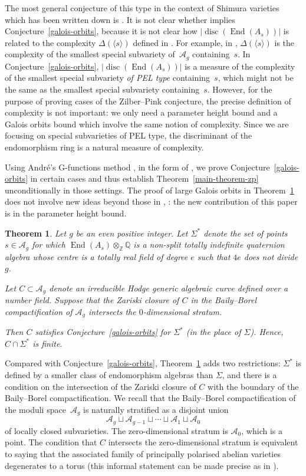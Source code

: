 \documentclass[JEP,XML,SOM,Unicode,NoFloatCountersInSection]{cedram}
\newcommand{\bQ}{\mathbb{Q}}
\newcommand{\bZ}{\mathbb{Z}}
\newcommand{\cA}{\mathcal{A}}
\newcommand{\Ag}{\mathcal{A}_g}
\DeclareMathOperator{\disc}{disc}
\DeclareMathOperator{\End}{End}
\newcommand{\abs}[1]{\lvert #1 \rvert}
\newtheorem{theorem}[lemma]{Theorem}
\begin{document}
The most general conjecture of this type in the context of Shimura varieties which has been written down is \cite[Conj.\,11.1]{DR18}.
It is not clear whether \cite[Conj.\,11.1]{DR18} implies Conjecture~\ref{galois-orbits}, because it is not clear how $\abs{\disc(\End(A_s))}$ is related to the complexity $\Delta(\langle s \rangle)$ defined in \cite{DR18}.
For example, in \cite[Conj.\,11.1]{DR18}, $\Delta(\langle s \rangle)$ is the complexity of the smallest special subvariety of~$\Ag$ containing~$s$.
In Conjecture~\ref{galois-orbits}, $\abs{\disc(\End(A_s))}$ is a measure of the complexity of the smallest special subvariety \textit{of PEL type} containing~$s$, which might not be the same as the smallest special subvariety containing~$s$.
However, for the purpose of proving cases of the Zilber--Pink conjecture, the precise definition of complexity is not important: we only need a parameter height bound and a Galois orbits bound which involve the same notion of complexity. Since we are focusing on special subvarieties of PEL type, the discriminant of the endomorphism ring is a natural measure of complexity.

Using André's G-functions method \cite{And89}, in the form of \cite[Th.\,8.2]{ExCM}, we prove Conjecture~\ref{galois-orbits} in certain cases and thus establish Theorem~\ref{main-theorem-zp} unconditionally in those settings.
The proof of large Galois orbits in Theorem~\ref{unconditional} does not involve new ideas beyond those in \cite{ExCM}, \cite{QRTUI}: the new contribution of this paper is in the parameter height bound.

\begin{theorem}\label{unconditional}
Let $g$ be an even positive integer.
Let $\Sigma^*$ denote the set of points $s \in \Ag$ for which $\End(A_s) \otimes_\bZ \bQ$ is a non-split totally indefinite quaternion algebra whose centre is a totally real field of degree $e$ such that $4e$ does not divide $g$.

Let $C\subset\cA_g$ denote an irreducible Hodge generic algebraic curve defined over a number field. Suppose that the Zariski closure of $C$ in the Baily--Borel compactification of $\Ag$ intersects the $0$-dimensional stratum.

Then $C$ satisfies Conjecture~\ref{galois-orbits} for $\Sigma^*$ (in the place of $\Sigma$). Hence, $C \cap \Sigma^*$ is finite.
\end{theorem}

Compared with Conjecture~\ref{galois-orbits}, Theorem~\ref{unconditional} adds two restrictions: $\Sigma^*$ is defined by a smaller class of endomorphism algebras than $\Sigma$, and there is a condition on the intersection of the Zariski closure of $C$ with the boundary of the Baily--Borel compactification.
We recall that the Baily--Borel compactification of the moduli space~$\cA_g$ is naturally stratified as a disjoint union
\[\cA_g\sqcup\cA_{g-1}\sqcup\cdots\sqcup\cA_1\sqcup\cA_0\]
of locally closed subvarieties.
The zero-dimensional stratum is $\cA_0$, which is a point.
The condition that $C$ intersects the zero-dimensional stratum is equivalent to saying that the associated family of principally polarised abelian varieties degenerates to a torus (this informal statement can be made precise as in \cite[Th.\,1.4]{ExCM}).
\end{document}
